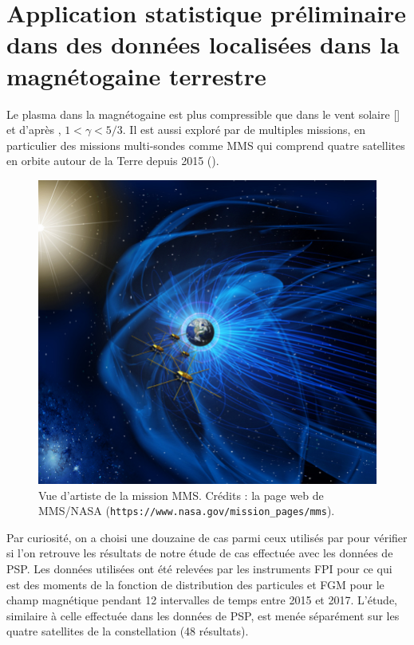 \section{Application statistique préliminaire dans des données localisées dans la magnétogaine terrestre}
\label{sec-143}

Le plasma dans la magnétogaine est plus compressible que dans le vent solaire [\cite{hadid_compressible_2018}] et d'après \cite{livadiotis_long-term_2018}, $1<\gamma<5/3$. Il est aussi exploré par de multiples missions, en particulier des missions multi-sondes comme \ac{MMS} qui comprend quatre satellites en orbite autour de la Terre depuis 2015 (). 
\begin{figure}[!ht]
 \centering
\includegraphics[width=0.7\linewidth,trim=0cm 6cm 6cm 4cm, clip=true]{./Part_1/images/MMS_mission}
\cprotect\caption{Vue d'artiste de la mission \ac{MMS}. Crédits : la page web de \ac{MMS}/\ac{NASA} (\verb|https://www.nasa.gov/mission_pages/mms|).}
\label{fig:MMS}
\end{figure}

Par curiosité, on a choisi une douzaine de cas parmi ceux utilisés par \cite{andres_energy_2019} pour vérifier si l'on retrouve les résultats de notre étude de cas effectuée avec les données de \ac{PSP}. Les données utilisées ont été relevées par les instruments \ac{FPI} pour ce qui est des moments de la fonction de distribution des particules et \ac{FGM} pour le champ magnétique pendant 12 intervalles de temps entre 2015 et 2017. L'étude, similaire à celle effectuée dans les données de \ac{PSP}, est menée séparément sur les quatre satellites de la constellation (48 résultats). 

